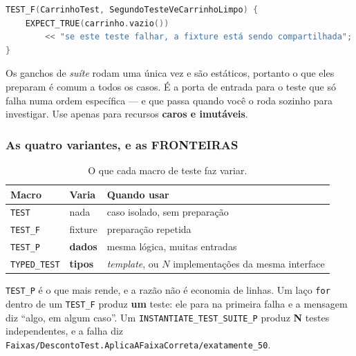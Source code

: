 \begin{lstlisting}[style=bt, language=C++,
    caption={O teste que prova que a fixture é reconstruída.}]
TEST_F(CarrinhoTest, SegundoTesteVeCarrinhoLimpo) {
    EXPECT_TRUE(carrinho.vazio())
        << "se este teste falhar, a fixture está sendo compartilhada";
}
\end{lstlisting}

\begin{armadilha}
Os ganchos de \emph{suíte} rodam uma única vez e são estáticos, portanto o que
eles preparam é comum a todos os casos. É a porta de entrada para o teste que só
falha numa ordem específica --- e que passa quando você o roda sozinho para
investigar. Use apenas para recursos \textbf{caros e imutáveis}.
\end{armadilha}

\subsubsection{As quatro variantes, e as FRONTEIRAS}

\begin{table}[htbp]
\centering
\caption{O que cada macro de teste faz variar.}
\label{tab:variantes-teste}
\footnotesize
\begin{tabular}{@{}lll@{}}
\toprule
\textbf{Macro} & \textbf{Varia} & \textbf{Quando usar} \\
\midrule
\texttt{TEST}       & nada    & caso isolado, sem preparação \\
\texttt{TEST\_F}    & fixture & preparação repetida \\
\texttt{TEST\_P}    & \textbf{dados} & mesma lógica, muitas entradas \\
\texttt{TYPED\_TEST}& \textbf{tipos} & \emph{template}, ou $N$ implementações da mesma interface \\
\bottomrule
\end{tabular}
\end{table}

\texttt{TEST\_P} é o que mais rende, e a razão não é economia de linhas. Um laço
\texttt{for} dentro de um \texttt{TEST\_F} produz \textbf{um} teste: ele para na
primeira falha e a mensagem diz ``algo, em algum caso''. Um
\texttt{INSTANTIATE\_TEST\_SUITE\_P} produz \textbf{N} testes independentes, e a
falha diz \texttt{Faixas/DescontoTest.AplicaAFaixaCorreta/exatamente\_50}.

